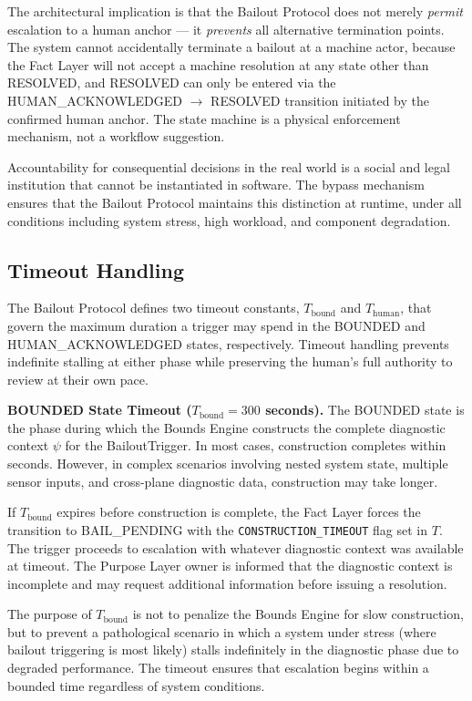 The architectural implication is that the Bailout Protocol does not merely \textit{permit} escalation to a human anchor --- it \textit{prevents} all alternative termination points. The system cannot accidentally terminate a bailout at a machine actor, because the Fact Layer will not accept a machine resolution at any state other than RESOLVED, and RESOLVED can only be entered via the HUMAN\_ACKNOWLEDGED $\rightarrow$ RESOLVED transition initiated by the confirmed human anchor. The state machine is a physical enforcement mechanism, not a workflow suggestion.

Accountability for consequential decisions in the real world is a social and legal institution that cannot be instantiated in software. The bypass mechanism ensures that the Bailout Protocol maintains this distinction at runtime, under all conditions including system stress, high workload, and component degradation.

\subsection{Timeout Handling}
\label{sec:bailout-timeouts}

The Bailout Protocol defines two timeout constants, $T_{\text{bound}}$ and $T_{\text{human}}$, that govern the maximum duration a trigger may spend in the BOUNDED and HUMAN\_ACKNOWLEDGED states, respectively. Timeout handling prevents indefinite stalling at either phase while preserving the human's full authority to review at their own pace.

\bigskip

\noindent\textbf{BOUNDED State Timeout ($T_{\text{bound}} = 300$ seconds).} The BOUNDED state is the phase during which the Bounds Engine constructs the complete diagnostic context $\psi$ for the BailoutTrigger. In most cases, construction completes within seconds. However, in complex scenarios involving nested system state, multiple sensor inputs, and cross-plane diagnostic data, construction may take longer.

If $T_{\text{bound}}$ expires before construction is complete, the Fact Layer forces the transition to BAIL\_PENDING with the \texttt{CONSTRUCTION\_TIMEOUT} flag set in $T$. The trigger proceeds to escalation with whatever diagnostic context was available at timeout. The Purpose Layer owner is informed that the diagnostic context is incomplete and may request additional information before issuing a resolution.

The purpose of $T_{\text{bound}}$ is not to penalize the Bounds Engine for slow construction, but to prevent a pathological scenario in which a system under stress (where bailout triggering is most likely) stalls indefinitely in the diagnostic phase due to degraded performance. The timeout ensures that escalation begins within a bounded time regardless of system conditions.

